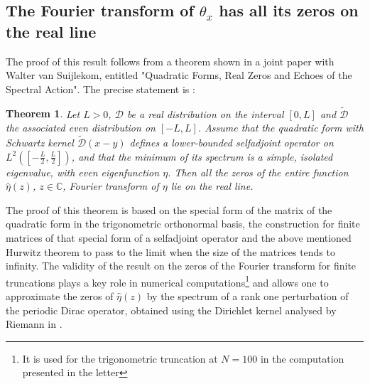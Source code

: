 \documentclass{article}
\newtheorem{thm}{Theorem}[section]
\def\C{\mathbb C}
\def\cD{{\mathcal D}}
\begin{document}
 \subsection{The Fourier transform of $\theta_x$ has all its zeros on the real line}\label{sectvW}
The proof of this result follows from a theorem shown in a joint paper \cite{CS} with Walter van Suijlekom, entitled "Quadratic Forms, Real Zeros  and Echoes of the Spectral Action". The precise statement is :
\begin{thm}\label{mainintro}
Let \( L > 0 \), \( \mathcal{D} \) be a real  distribution on the interval \( [0, L] \) and $\tilde \cD$ the associated even distribution on \( [-L, L] \). Assume that the quadratic form with Schwartz kernel \( \tilde \cD(x - y) \) defines a lower-bounded selfadjoint operator  on \( L^2([-\frac{L}{2}, \frac{L}{2}]) \), and that the minimum of its spectrum is a simple, isolated eigenvalue, with even eigenfunction $\eta$. Then all the zeros of the entire function $\widehat \eta(z)$, $z\in \C$, Fourier transform  of $\eta$ lie on the real line.
\end{thm}
The proof of this theorem is based on the special form of the matrix of the quadratic form
 in the trigonometric orthonormal basis, the construction for finite matrices of that special form of a selfadjoint operator and the above mentioned Hurwitz theorem to pass to the limit when the size of the matrices tends to infinity. The validity of the result on the zeros of the Fourier transform for finite truncations \cite{CS} plays a key role in numerical computations\footnote{It is used for the trigonometric truncation at $N=100$ in the computation presented in the letter} and allows one to approximate the zeros of $\widehat \eta(z)$ by the spectrum of a rank one perturbation of the periodic Dirac operator, obtained using the Dirichlet kernel analysed by Riemann in \cite{Riemann1}.

  
\end{document}
